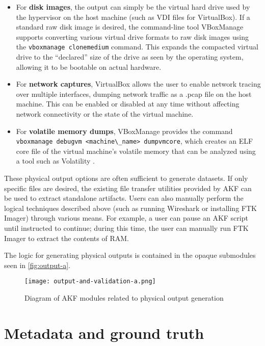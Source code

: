 \begin{itemize}
\tightlist
\item
  For \textbf{disk images}, the output can simply be the virtual hard
  drive used by the hypervisor on the host machine (such as VDI files
  for VirtualBox). If a standard raw disk image is desired, the
  command-line tool VBoxManage supports converting various virtual drive
  formats to raw disk images using the
  \passthrough{\lstinline!vboxmanage clonemedium!} command. This expands
  the compacted virtual drive to the ``declared'' size of the drive as
  seen by the operating system, allowing it to be bootable on actual
  hardware.
\item
  For \textbf{network captures}, VirtualBox allows the user to enable
  network tracing over multiple interfaces, dumping network traffic as a
  .pcap file on the host machine. This can be enabled or disabled at any
  time without affecting network connectivity or the state of the
  virtual machine.
\item
  For \textbf{volatile memory dumps}, VBoxManage provides the command
  \passthrough{\lstinline!vboxmanage debugvm <machine\_name> dumpvmcore!},
  which creates an ELF core file of the virtual machine's volatile
  memory that can be analyzed using a tool such as Volatility
  \cite{volatilityfoundationVolatility32025}.
\end{itemize}

These physical output options are often sufficient to generate datasets.
If only specific files are desired, the existing file transfer utilities
provided by AKF can be used to extract standalone artifacts. Users can
also manually perform the logical techniques described above (such as
running Wireshark or installing FTK Imager) through various means. For
example, a user can pause an AKF script until instructed to continue;
during this time, the user can manually run FTK Imager to extract the
contents of RAM.

The logic for generating physical outputs is contained in the opaque
submodules seen in \autoref{fig:output-a}.

\begin{figure}[h]
\centering
\texttt{[image: output-and-validation-a.png]}
\caption{Diagram of AKF modules related to physical output
generation}\label{fig:output-a}
\end{figure}

\section{Metadata and ground
truth}\label{metadata-and-ground-truth}

